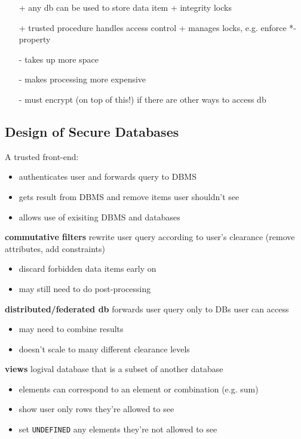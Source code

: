 \documentclass[]{article}
\theoremstyle{definition}
\begin{document}
	\begin{itemize}
		\item[+] any db can be used to store data item + integrity locks
		\item[+] trusted procedure handles access control + manages locks, e.g. enforce *-property
		\item[-] takes up more space
		\item[-] makes processing more expensive
		\item[-] must encrypt (on top of this!) if there are other ways to access db
	\end{itemize}


	\subsection{Design of Secure Databases}
	A trusted front-end:
	\begin{itemize}
		\item authenticates user and forwards query to DBMS
		\item gets result from DBMS and remove items user shouldn't see
		\item allows use of exisiting DBMS and databases
	\end{itemize}

	\textbf{commutative filters} rewrite user query according to user's clearance (remove attributes, add constraints)
	\begin{itemize}
		\item discard forbidden data items early on
		\item may still need to do post-processing
	\end{itemize}

	\textbf{distributed/federated db} forwards user query only to DBs user can access
	\begin{itemize}
		\item may need to combine results
		\item doesn't scale to many different clearance levels
	\end{itemize}

	\textbf{views} logival database that is a subset of another database
	\begin{itemize}
		\item elements can correspond to an element or combination (e.g. sum)
		\item show user only rows they're allowed to see
		\item set \texttt{UNDEFINED} any elements they're not allowed to see
	\end{itemize}
\end{document}
